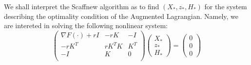 We shall interpret the Scaffnew algorithm as to find $(X_*, z_*, H_*)$ for the system describing the optimality condition of the Augmented Lagrangian. Namely, we are intereted in solving the following nonlinear system: \begin{equation}
\label{completesystem}
\begin{pmatrix}
\nabla F(\cdot)+ r I & - r K & -I \\
-r K^T& r K^TK & K^T\\
-I& K & 0\\
\end{pmatrix}
\begin{pmatrix}
X_*\\
z_* \\
H_*
\end{pmatrix} = 
\begin{pmatrix}
0\\
0\\
0
\end{pmatrix}
\end{equation}

